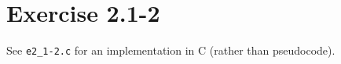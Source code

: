 \documentclass{article}
\begin{document}
\section*{Exercise 2.1-2}

See \texttt{e2\_1-2.c} for an implementation in C (rather than pseudocode).
\end{document}
